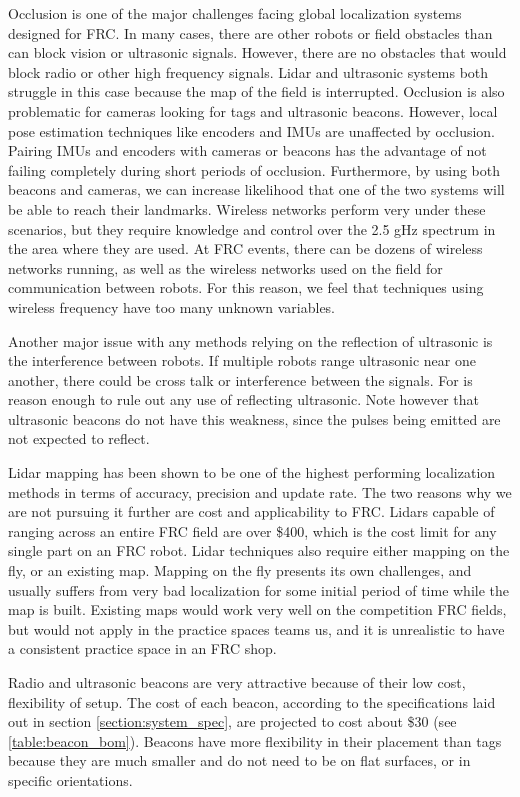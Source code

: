 \documentclass{article}
\begin{document}
  Occlusion is one of the major challenges facing global localization systems designed for FRC. In many cases, there are other robots or field obstacles than can block vision or ultrasonic signals. However, there are no obstacles that would block radio or other high frequency signals. Lidar and ultrasonic systems both struggle in this case because the map of the field is interrupted. Occlusion is also problematic for cameras looking for tags and ultrasonic beacons. However, local pose estimation techniques like encoders and IMUs are unaffected by occlusion. Pairing IMUs and encoders with cameras or beacons has the advantage of not failing completely during short periods of occlusion. Furthermore, by using both beacons and cameras, we can increase likelihood that one of the two systems will be able to reach their landmarks. Wireless networks perform very under these scenarios, but they require knowledge and control over the 2.5 gHz spectrum in the area where they are used. At FRC events, there can be dozens of wireless networks running, as well as the wireless networks used on the field for communication between robots. For this reason, we feel that techniques using wireless frequency have too many unknown variables.

  Another major issue with any methods relying on the reflection of ultrasonic is the interference between robots. If multiple robots range ultrasonic near one another, there could be cross talk or interference between the signals. For is reason enough to rule out any use of reflecting ultrasonic. Note however that ultrasonic beacons do not have this weakness, since the pulses being emitted are not expected to reflect.

  Lidar mapping has been shown to be one of the highest performing localization methods in terms of accuracy, precision and update rate. The two reasons why we are not pursuing it further are cost and applicability to FRC. Lidars capable of ranging across an entire FRC field are over \$400, which is the cost limit for any single part on an FRC robot. Lidar techniques also require either mapping on the fly, or an existing map. Mapping on the fly presents its own challenges, and usually suffers from very bad localization for some initial period of time while the map is built. Existing maps would work very well on the competition FRC fields, but would not apply in the practice spaces teams us, and it is unrealistic to have a consistent practice space in an FRC shop.

  Radio and ultrasonic beacons are very attractive because of their low cost, flexibility of setup. The cost of each beacon, according to the specifications laid out in section \ref{section:system_spec}, are projected to cost about \$30 (see \ref{table:beacon_bom}). Beacons have more flexibility in their placement than tags because they are much smaller and do not need to be on flat surfaces, or in specific orientations.
\end{document}
